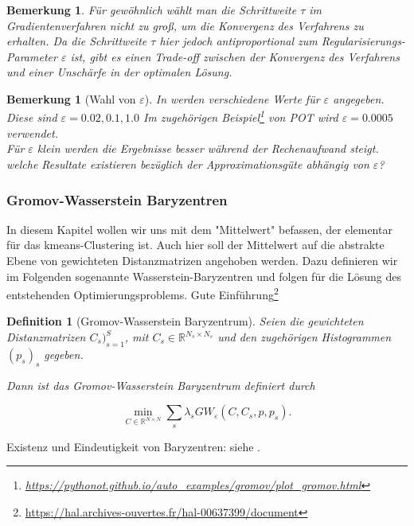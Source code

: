 \documentclass[11pt,a4paper]{article}
\newtheorem{definition}[theorem]{Definition}
\newtheorem{remark}[theorem]{Bemerkung}
\numberwithin{equation}{section}
\begin{document}
	
	\begin{remark}
		Für gewöhnlich wählt man die Schrittweite $ \tau$ im Gradientenverfahren nicht zu groß, um die Konvergenz des Verfahrens zu erhalten. Da die Schrittweite $\tau$ hier jedoch antiproportional zum Regularisierungs-Parameter $\varepsilon$ ist, gibt es einen Trade-off zwischen der Konvergenz des Verfahrens und einer Unschärfe in der optimalen Lösung. 
	\end{remark}
	
	\begin{remark}[Wahl von $\varepsilon$]
		In \cite{cuturi2013sinkhorn} werden verschiedene Werte für $\varepsilon$ angegeben. Diese sind $\varepsilon = 0.02, 0.1, 1.0$ Im zugehörigen Beispiel\footnote{\url{https://pythonot.github.io/auto_examples/gromov/plot_gromov.html}} von POT wird $\varepsilon = 0.0005$ verwendet. \\
		Für $\varepsilon$ klein werden die Ergebnisse besser während der Rechenaufwand steigt.\\
		welche Resultate existieren bezüglich der Approximationsgüte abhängig von $\varepsilon$?
	\end{remark}
	\subsubsection{Gromov-Wasserstein Baryzentren}
	In diesem Kapitel wollen wir uns mit dem "Mittelwert" befassen, der elementar für das kmeans-Clustering ist.
	Auch hier soll der Mittelwert auf die abstrakte Ebene von gewichteten Distanzmatrizen angehoben werden.
	Dazu definieren wir im Folgenden sogenannte Wasserstein-Baryzentren und folgen \cite{gwd_averaging_kernels} für die Lösung des entstehenden Optimierungsproblems.
	Gute Einführung\footnote{\url{https://hal.archives-ouvertes.fr/hal-00637399/document}}
	\begin{definition}[Gromov-Wasserstein Baryzentrum]
		Seien die gewichteten Distanzmatrizen $C_s)_{s=1}^S$, mit $C_s \in \mathbb{R}^{N_s \times N_s}$ und den zugehörigen Histogrammen $(p_s)_s$ gegeben.
		
		Dann ist das Gromov-Wasserstein Baryzentrum definiert durch
		
		\begin{equation}
		\min_{C \in \mathbb{R}^{N \times N}} \sum_s{\lambda_s GW_{\varepsilon}(C,C_s,p,p_s)}. \label{eq:bary_prob}
		\end{equation}
	\end{definition}
	
	Existenz und Eindeutigkeit von Baryzentren: siehe \cite{bary_wasserstein_space}.
	
\end{document}
